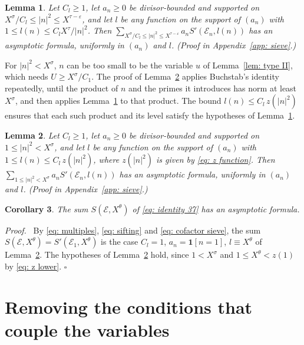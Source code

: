 \documentclass{article}
\numberwithin{equation}{section}
\newtheorem{lemma}{Lemma}
\newtheorem{corollary}[lemma]{Corollary}
\newenvironment{proof}[1][Proof]{\par\medskip\noindent\textit{#1.}\ }{\hfill$\square$\par\medskip}
\newcommand{\Le}{\leqslant}
\newcommand{\Ge}{\geqslant}
\begin{document}
\begin{lemma}
\label{lem: level large}
Let $C_l \Ge 1$, let $a_n \Ge 0$ be divisor-bounded and supported on $X^{\sigma}/C_l \Le |n|^2 \Le X^{\tau - \varepsilon}$, and let $l$ be any function on the support of $(a_n)$ with $1 \Le l(n) \Le C_l X^{\tau}/|n|^2$. Then $\sum_{X^{\sigma}/C_l \Le |n|^2 \Le X^{\tau - \varepsilon}} a_n S'(\mathcal{E}_n, l(n))$ has an asymptotic formula, uniformly in $(a_n)$ and $l$.
\emph{(Proof in Appendix~\ref{app: sieve}.)}
\end{lemma}

For $|n|^2 < X^{\sigma}$, $n$ can be too small to be the variable $u$ of Lemma~\ref{lem: type II}, which needs $U \Ge X^{\sigma}/C_1$. The proof of Lemma~\ref{lem: level small} applies Buchstab's identity repeatedly, until the product of $n$ and the primes it introduces has norm at least $X^{\sigma}$, and then applies Lemma~\ref{lem: level large} to that product. The bound $l(n) \Le C_l\, z(|n|^2)$ ensures that each such product and its level satisfy the hypotheses of Lemma~\ref{lem: level large}.

\begin{lemma}
\label{lem: level small}
Let $C_l \Ge 1$, let $a_n \Ge 0$ be divisor-bounded and supported on $1 \Le |n|^2 < X^{\sigma}$, and let $l$ be any function on the support of $(a_n)$ with $1 \Le l(n) \Le C_l\, z(|n|^2)$, where $z(|n|^2)$ is given by \eqref{eq: z function}. Then $\sum_{1 \Le |n|^2 < X^{\sigma}} a_n S'(\mathcal{E}_n, l(n))$ has an asymptotic formula, uniformly in $(a_n)$ and $l$.
\emph{(Proof in Appendix~\ref{app: sieve}.)}
\end{lemma}

\begin{corollary}
\label{cor: level one}
The sum $S(\mathcal{E}, X^{\theta})$ of \eqref{eq: identity 37} has an asymptotic formula.
\end{corollary}

\begin{proof}
By \eqref{eq: multiples}, \eqref{eq: sifting} and \eqref{eq: cofactor sieve}, the sum $S(\mathcal{E}, X^{\theta}) = S'(\mathcal{E}_1, X^{\theta})$ is the case $C_l = 1$, $a_n = \mathbf{1}[n = 1]$, $l \equiv X^{\theta}$ of Lemma~\ref{lem: level small}. The hypotheses of Lemma~\ref{lem: level small} hold, since $1 < X^{\sigma}$ and $1 \Le X^{\theta} < z(1)$ by \eqref{eq: z lower}.
\end{proof}

\section{Removing the conditions that couple the variables}
\label{sec: decoupling}
\end{document}
